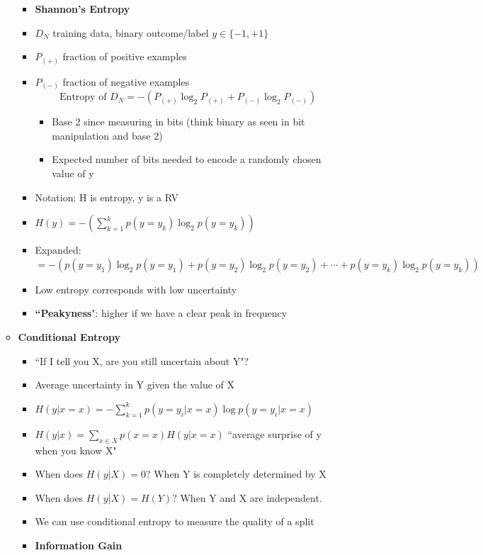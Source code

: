 \documentclass[10pt, oneside]{article}
\begin{document}
\begin{itemize}
\begin{itemize}
\begin{itemize}
            \item \textbf{Shannon's Entropy}
            \item $D_N$ training data, binary outcome/label $y\in\{-1,+1\}$
            \item $P_{(+)}$ fraction of positive examples
            \item $P_{(-)}$ fraction of negative examples\[\text{Entropy of }D_N = -(P_{(+)} \log_2 P_{(+)} + P_{(-)} \log_2P_{(-)})\]
            \begin{itemize}
                \item Base 2 since measuring in bits (think binary as seen in bit manipulation and base 2)
                \item Expected number of bits needed to encode a randomly chosen value of y
            \end{itemize}
            \item Notation: H is entropy, y is a RV
            \item $H(y) = -\left(\sum_{k=1}^k p(y=y_k) \log_2 p(y=y_k)\right)$
            \item Expanded: $=-\left(p(y=y_1)\log_2p(y=y_1) + p(y=y_2) \log_2 p(y=y_2) + \cdots + p(y=y_k)\log_2p(y=y_k)\right)$
            \item Low entropy corresponds with low uncertainty
            \item \textbf{``Peakyness}": higher if we have a clear peak in frequency
        \end{itemize}
        \item \textbf{Conditional Entropy}
        \begin{itemize}
            \item ``If I tell you X, are you still uncertain about Y"?
            \item Average uncertainty in Y given the value of X
            \item $H(y|x=x) = -\sum_{k=1} ^k p(y=y_i | x=x) \log p(y=y_i | x=x)$
            \item $H(y|x) = \sum_{x\in X} p(x=x) H(y|x=x)$ ``average surprise of y when you know X"
            \item When does $H(y|X) = 0?$ When Y is completely determined by X
            \item When does $H(y|X) = H(Y)?$ When Y and X are independent.
            \item We can use conditional entropy to measure the quality of a split
            \item \textbf{Information Gain}

\end{itemize}
\end{itemize}
\end{itemize}
\end{document}
